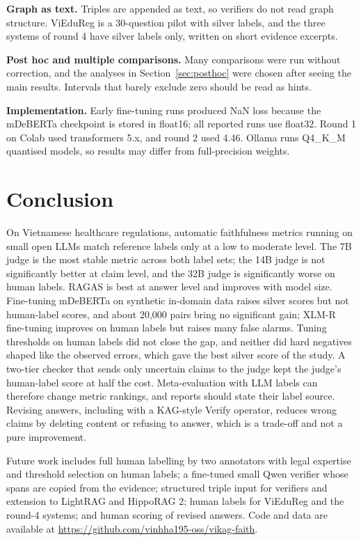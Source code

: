 \documentclass[conference]{IEEEtran}
\begin{document}
\textbf{Graph as text.} Triples are appended as text, so verifiers do not read graph structure. ViEduReg is a 30-question pilot with silver labels, and the three systems of round 4 have silver labels only, written on short evidence excerpts.

\textbf{Post hoc and multiple comparisons.} Many comparisons were run without correction, and the analyses in Section~\ref{sec:posthoc} were chosen after seeing the main results. Intervals that barely exclude zero should be read as hints.

\textbf{Implementation.} Early fine-tuning runs produced NaN loss because the mDeBERTa checkpoint is stored in float16; all reported runs use float32. Round 1 on Colab used transformers 5.x, and round 2 used 4.46. Ollama runs Q4\_K\_M quantised models, so results may differ from full-precision weights.

\section{Conclusion}
On Vietnamese healthcare regulations, automatic faithfulness metrics running on small open LLMs match reference labels only at a low to moderate level. The 7B judge is the most stable metric across both label sets; the 14B judge is not significantly better at claim level, and the 32B judge is significantly worse on human labels. RAGAS is best at answer level and improves with model size. Fine-tuning mDeBERTa on synthetic in-domain data raises silver scores but not human-label scores, and about 20,000 pairs bring no significant gain; XLM-R fine-tuning improves on human labels but raises many false alarms. Tuning thresholds on human labels did not close the gap, and neither did hard negatives shaped like the observed errors, which gave the best silver score of the study. A two-tier checker that sends only uncertain claims to the judge kept the judge's human-label score at half the cost. Meta-evaluation with LLM labels can therefore change metric rankings, and reports should state their label source. Revising answers, including with a KAG-style Verify operator, reduces wrong claims by deleting content or refusing to answer, which is a trade-off and not a pure improvement.

Future work includes full human labelling by two annotators with legal expertise and threshold selection on human labels; a fine-tuned small Qwen verifier whose spans are copied from the evidence; structured triple input for verifiers and extension to LightRAG and HippoRAG 2; human labels for ViEduReg and the round-4 systems; and human scoring of revised answers. Code and data are available at \url{https://github.com/vinhha195-oss/vikag-faith}.
\end{document}
